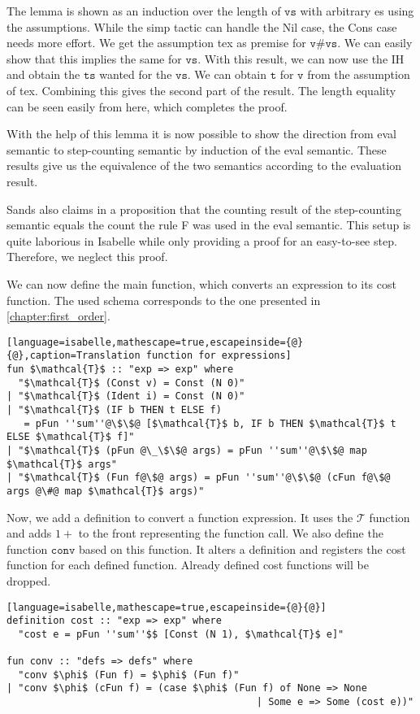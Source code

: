The lemma is shown as an induction over the length of $\texttt{vs}$ with arbitrary es using the assumptions.
While the simp tactic can handle the Nil case, the Cons case needs more effort.
We get the assumption tex as premise for $\texttt{v\#vs}$.
We can easily show that this implies the same for $\texttt{vs}$.
With this result, we can now use the IH and obtain the $\texttt{ts}$ wanted for the $\texttt{vs}$.
We can obtain $\texttt{t}$ for $\texttt{v}$ from the assumption of tex.
Combining this gives the second part of the result.
The length equality can be seen easily from here, which completes the proof.

With the help of this lemma it is now possible to show the direction from eval semantic to step-counting semantic by induction of the eval semantic.
These results give us the equivalence of the two semantics according to the evaluation result.

Sands also claims in a proposition that the counting result of the step-counting semantic equals the count the rule F was used in the eval semantic.
This setup is quite laborious in Isabelle while only providing a proof for an easy-to-see step.
Therefore, we neglect this proof.

We can now define the main function, which converts an expression to its cost function.
The used schema corresponds to the one presented in \autoref{chapter:first_order}.
\begin{lstlisting}[language=isabelle,mathescape=true,escapeinside={@}{@},caption=Translation function for expressions]
fun $\mathcal{T}$ :: "exp => exp" where
  "$\mathcal{T}$ (Const v) = Const (N 0)"
| "$\mathcal{T}$ (Ident i) = Const (N 0)"
| "$\mathcal{T}$ (IF b THEN t ELSE f)
   = pFun ''sum''@\$\$@ [$\mathcal{T}$ b, IF b THEN $\mathcal{T}$ t ELSE $\mathcal{T}$ f]"
| "$\mathcal{T}$ (pFun @\_\$\$@ args) = pFun ''sum''@\$\$@ map $\mathcal{T}$ args"
| "$\mathcal{T}$ (Fun f@\$@ args) = pFun ''sum''@\$\$@ (cFun f@\$@ args @\#@ map $\mathcal{T}$ args)"
\end{lstlisting}

Now, we add a definition to convert a function expression.
It uses the $\mathcal{T}$ function and adds $1+$ to the front representing the function call.
We also define the function $\texttt{conv}$ based on this function.
It alters a definition and registers the cost function for each defined function.
Already defined cost functions will be dropped.
\begin{lstlisting}[language=isabelle,mathescape=true,escapeinside={@}{@}]
definition cost :: "exp => exp" where
  "cost e = pFun ''sum''$$ [Const (N 1), $\mathcal{T}$ e]"

fun conv :: "defs => defs" where
  "conv $\phi$ (Fun f) = $\phi$ (Fun f)"
| "conv $\phi$ (cFun f) = (case $\phi$ (Fun f) of None => None
                                           | Some e => Some (cost e))"
\end{lstlisting}

